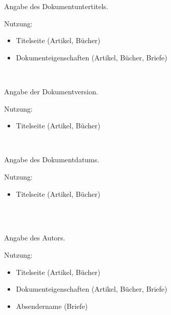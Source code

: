 \DescribeMacro{\subtitle}
Angabe des Dokumentuntertitels.

Nutzung:
\begin{itemize}
	\item Titelseite (Artikel, Bücher)
	\item Dokumenteigenschaften (Artikel, Bücher, Briefe)
\end{itemize}

\begin{nutzung}
		\>\\
	\beispiel
		\>
\end{nutzung}

\DescribeMacro{\version}
Angabe der Dokumentversion.

Nutzung:
\begin{itemize}
	\item Titelseite (Artikel, Bücher)
\end{itemize}

\begin{nutzung}
		\>\\
	\beispiel
		\>
\end{nutzung}

\DescribeMacro{\date}
Angabe des Dokumentdatums.

Nutzung:
\begin{itemize}
	\item Titelseite (Artikel, Bücher)
\end{itemize}

\begin{nutzung}
		\>\\
	\beispiel
		\>\\
		\>
\end{nutzung}

\DescribeMacro{\author}
Angabe des Autors.

Nutzung:
\begin{itemize}
	\item Titelseite (Artikel, Bücher)
	\item Dokumenteigenschaften (Artikel, Bücher, Briefe)
	\item Absendername (Briefe)
\end{itemize}

\begin{nutzung}
		\>\\
	\beispiel
		\>
\end{nutzung}

